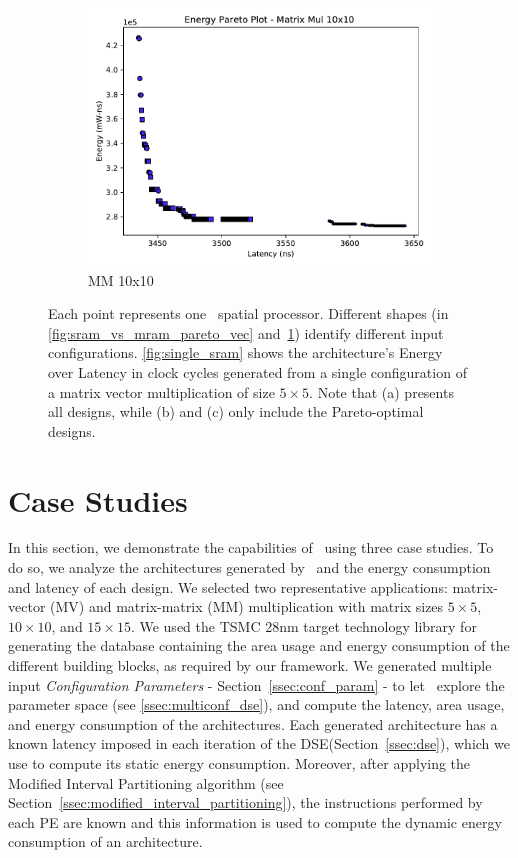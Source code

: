 \begin{figure}[ht]
\begin{subfigure}{.33\textwidth}
  \includegraphics[width=\textwidth]{graphs/EnergyParetoMatrixMul10.pdf}
  \caption{MM 10x10}
  \label{fig:sram_vs_mram_pareto_mul}
\end{subfigure}
    \caption{\small Each point represents one \frameworkname~spatial processor. Different shapes (in \ref{fig:sram_vs_mram_pareto_vec} and~\ref{fig:sram_vs_mram_pareto_mul}) identify different input configurations. \ref{fig:single_sram} shows the architecture's Energy over Latency in clock cycles generated from a single configuration of a matrix vector multiplication of size $5\times5$. Note that (a) presents all designs, while (b) and (c) only include the Pareto-optimal designs.}
\label{fig:case_studies_1}
\end{figure}
\section{Case Studies}
\label{sec:case_studies}
In this section, we demonstrate the capabilities of \frameworkname~using three case studies. To do so, we analyze the architectures generated by \frameworkname~and the energy consumption and latency of each design.
We selected two representative applications: matrix-vector (MV) and matrix-matrix (MM) multiplication with matrix sizes $5\times5$, $10\times10$, and $15\times15$. We used the TSMC 28nm target technology library for generating the database containing the area usage and energy consumption of the different building blocks, as required by our framework.
We generated multiple input \textit{Configuration Parameters} - Section~\ref{ssec:conf_param} - to let \frameworkname~explore the parameter space  (see \ref{ssec:multiconf_dse}), and compute the latency, area usage, and energy consumption of the architectures. Each generated architecture has a known latency imposed in each iteration of the DSE(Section~\ref{ssec:dse}), which we use to compute its static energy consumption. Moreover, after applying the Modified Interval Partitioning algorithm (see Section~\ref{ssec:modified_interval_partitioning}), the instructions performed by each PE are known and this information is used to compute the dynamic energy consumption of an architecture.

